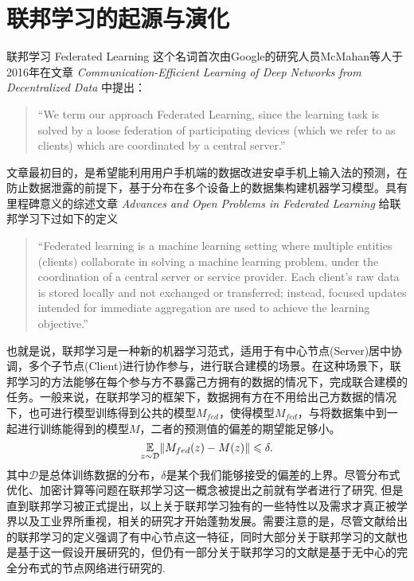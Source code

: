 \section{联邦学习的起源与演化}
\label{sec:chap1-fl-origin}

联邦学习 Federated Learning 这个名词首次由Google的研究人员McMahan等人于2016年在文章 \emph{Communication-Efficient Learning of Deep Networks from Decentralized Data}\cite{mcmahan2017fed_avg} 中提出：
\begin{quote}
    ``We term our approach Federated Learning, since the learning task is solved by a loose federation of participating devices (which we refer to as clients) which are coordinated by a central server.''
\end{quote}
文章\parencite{mcmahan2017fed_avg}最初目的，是希望能利用用户手机端的数据改进安卓手机上输入法的预测，在防止数据泄露的前提下，基于分布在多个设备上的数据集构建机器学习模型。具有里程碑意义的综述文章 \emph{Advances and Open Problems in Federated Learning}\cite{kairouz2019advances_fl} 给联邦学习下过如下的定义
\begin{quote}
    ``Federated learning is a machine learning setting where multiple entities (clients) collaborate in solving a machine learning problem, under the coordination of a central server or service provider. Each client's raw data is stored locally and not exchanged or transferred; instead, focused updates intended for immediate aggregation are used to achieve the learning objective.''
\end{quote}
也就是说，联邦学习是一种新的机器学习范式，适用于有中心节点(Server)居中协调，多个子节点(Client)进行协作参与，进行联合建模的场景。在这种场景下，联邦学习的方法能够在每个参与方不暴露己方拥有的数据的情况下，完成联合建模的任务。一般来说，在联邦学习的框架下，数据拥有方在不用给出己方数据的情况下，也可进行模型训练得到公共的模型$M_{fed}$，使得模型$M_{fed}$，与将数据集中到一起进行训练能得到的模型$M$，二者的预测值的偏差的期望能足够小。
\begin{equation}
\label{eq:general-fl}
\operatorname*{\mathbb{E}}_{z\sim\mathcal{D}} \lVert M_{fed}(z) - M(z) \rVert \leqslant \delta.
\end{equation}
其中$\mathcal{D}$是总体训练数据的分布，$\delta$是某个我们能够接受的偏差的上界。尽管分布式优化、加密计算等问题在联邦学习这一概念被提出之前就有学者进行了研究\cite{boyd2011distributed, dist_pca_2014_nips, Gentry_2009_FHE, Nikolaenko_2013}, 但是直到联邦学习被正式提出\cite{mcmahan2017fed_avg}，以上关于联邦学习独有的一些特性以及需求才真正被学界以及工业界所重视，相关的研究才开始蓬勃发展。需要注意的是，尽管文献\parencite{kairouz2019advances_fl}给出的联邦学习的定义强调了有中心节点这一特征，同时大部分关于联邦学习的文献也是基于这一假设开展研究的，但仍有一部分关于联邦学习的文献是基于无中心的完全分布式的节点网络进行研究的\cite{elgabli2020gadmm, issaid2020cq-ggadmm}.

